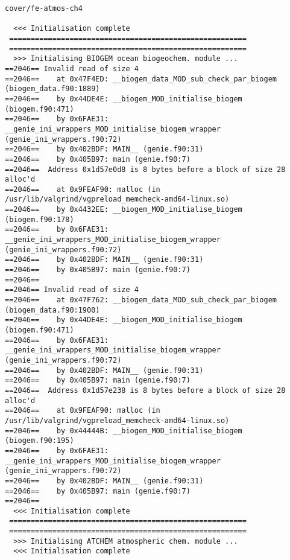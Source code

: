 \documentclass[a4paper,10pt,article]{memoir}
\begin{document}
\begin{verbatim}
cover/fe-atmos-ch4

  <<< Initialisation complete
 =======================================================
 =======================================================
  >>> Initialising BIOGEM ocean biogeochem. module ...
==2046== Invalid read of size 4
==2046==    at 0x47F4ED: __biogem_data_MOD_sub_check_par_biogem (biogem_data.f90:1889)
==2046==    by 0x44DE4E: __biogem_MOD_initialise_biogem (biogem.f90:471)
==2046==    by 0x6FAE31: __genie_ini_wrappers_MOD_initialise_biogem_wrapper (genie_ini_wrappers.f90:72)
==2046==    by 0x402BDF: MAIN__ (genie.f90:31)
==2046==    by 0x405B97: main (genie.f90:7)
==2046==  Address 0x1d57e0d8 is 8 bytes before a block of size 28 alloc'd
==2046==    at 0x9FEAF90: malloc (in /usr/lib/valgrind/vgpreload_memcheck-amd64-linux.so)
==2046==    by 0x4432EE: __biogem_MOD_initialise_biogem (biogem.f90:178)
==2046==    by 0x6FAE31: __genie_ini_wrappers_MOD_initialise_biogem_wrapper (genie_ini_wrappers.f90:72)
==2046==    by 0x402BDF: MAIN__ (genie.f90:31)
==2046==    by 0x405B97: main (genie.f90:7)
==2046==
==2046== Invalid read of size 4
==2046==    at 0x47F762: __biogem_data_MOD_sub_check_par_biogem (biogem_data.f90:1900)
==2046==    by 0x44DE4E: __biogem_MOD_initialise_biogem (biogem.f90:471)
==2046==    by 0x6FAE31: __genie_ini_wrappers_MOD_initialise_biogem_wrapper (genie_ini_wrappers.f90:72)
==2046==    by 0x402BDF: MAIN__ (genie.f90:31)
==2046==    by 0x405B97: main (genie.f90:7)
==2046==  Address 0x1d57e238 is 8 bytes before a block of size 28 alloc'd
==2046==    at 0x9FEAF90: malloc (in /usr/lib/valgrind/vgpreload_memcheck-amd64-linux.so)
==2046==    by 0x44444B: __biogem_MOD_initialise_biogem (biogem.f90:195)
==2046==    by 0x6FAE31: __genie_ini_wrappers_MOD_initialise_biogem_wrapper (genie_ini_wrappers.f90:72)
==2046==    by 0x402BDF: MAIN__ (genie.f90:31)
==2046==    by 0x405B97: main (genie.f90:7)
==2046==
  <<< Initialisation complete
 =======================================================
 =======================================================
  >>> Initialising ATCHEM atmospheric chem. module ...
  <<< Initialisation complete

\end{verbatim}
\end{document}
